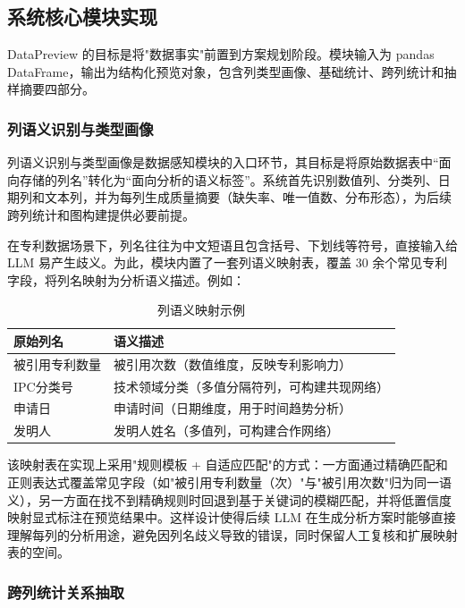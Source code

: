 \subsection{系统核心模块实现}

DataPreview 的目标是将"数据事实"前置到方案规划阶段。模块输入为 pandas DataFrame，输出为结构化预览对象，包含列类型画像、基础统计、跨列统计和抽样摘要四部分。

\subsubsection{列语义识别与类型画像}

列语义识别与类型画像是数据感知模块的入口环节，其目标是将原始数据表中“面向存储的列名”转化为“面向分析的语义标签”。系统首先识别数值列、分类列、日期列和文本列，并为每列生成质量摘要（缺失率、唯一值数、分布形态），为后续跨列统计和图构建提供必要前提。

在专利数据场景下，列名往往为中文短语且包含括号、下划线等符号，直接输入给 LLM 易产生歧义。为此，模块内置了一套列语义映射表，覆盖 30 余个常见专利字段，将列名映射为分析语义描述。例如：

\begin{table}[htbp]
\centering
\caption{列语义映射示例}
\label{tab:column-mapping}
\begin{tabular}{@{}ll@{}}
\toprule
原始列名 & 语义描述 \\ \midrule
被引用专利数量 & 被引用次数（数值维度，反映专利影响力） \\
IPC分类号 & 技术领域分类（多值分隔符列，可构建共现网络） \\
申请日 & 申请时间（日期维度，用于时间趋势分析） \\
发明人 & 发明人姓名（多值列，可构建合作网络） \\ \bottomrule
\end{tabular}
\end{table}

该映射表在实现上采用"规则模板 + 自适应匹配"的方式：一方面通过精确匹配和正则表达式覆盖常见字段（如"被引用专利数量（次）"与"被引用次数"归为同一语义），另一方面在找不到精确规则时回退到基于关键词的模糊匹配，并将低置信度映射显式标注在预览结果中。这样设计使得后续 LLM 在生成分析方案时能够直接理解每列的分析用途，避免因列名歧义导致的错误，同时保留人工复核和扩展映射表的空间。

\subsubsection{跨列统计关系抽取}

